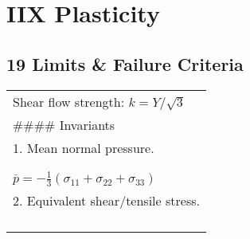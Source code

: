 \hypertarget{iix-plasticity}{%
\section{IIX Plasticity}\label{iix-plasticity}}

\hypertarget{limits-failure-criteria}{%
\subsection{19 Limits \& Failure
Criteria}\label{limits-failure-criteria}}

\begin{longtable}[]{@{}l@{}}
\toprule
\endhead
\begin{minipage}[t]{0.47\columnwidth}\raggedright
Shear flow strength: \(k = Y/\sqrt{3}\)\strut
\end{minipage}\tabularnewline
\begin{minipage}[t]{0.47\columnwidth}\raggedright
\#\#\#\# Invariants\strut
\end{minipage}\tabularnewline
\begin{minipage}[t]{0.47\columnwidth}\raggedright
1. Mean normal pressure.\strut
\end{minipage}\tabularnewline
\begin{minipage}[t]{0.47\columnwidth}\raggedright
\(\bar{p}=-\frac{1}{3} \operatorname{tr} \sigma=-\frac{1}{3}\left(\sigma_{k k}\right)\\\)\strut
\end{minipage}\tabularnewline
\begin{minipage}[t]{0.47\columnwidth}\raggedright
\(\bar{p}=-\frac{1}{3}\left(\sigma_{11}+\sigma_{22}+\sigma_{33}\right)\)\strut
\end{minipage}\tabularnewline
\begin{minipage}[t]{0.47\columnwidth}\raggedright
2. Equivalent shear/tensile stress.\strut
\end{minipage}\tabularnewline
\begin{minipage}[t]{0.47\columnwidth}\raggedright
\(\bar{\tau}=\frac{1}{\sqrt{2}}\left|\sigma^{\prime}\right|=\sqrt{\frac{1}{2} \operatorname{tr}\left(\sigma^{\prime 2}\right)}=\sqrt{\frac{1}{2} \sigma_{i j}^{\prime} \sigma_{i j}^{\prime}}\\\)\strut
\end{minipage}\tabularnewline
\begin{minipage}[t]{0.47\columnwidth}\raggedright
\(\bar{\tau}=\left[\frac{1}{6}\left(\left(\sigma_{11}-\sigma_{22}\right)^{2}+\left(\sigma_{22}-\sigma_{33}\right)^{2}+\left(\sigma_{33}-\sigma_{11}\right)^{2}\right)+\left(\sigma_{12}^{2}+\sigma_{23}^{2}+\sigma_{31}^{2}\right)\right]^{1 / 2}\\\)\strut

\end{minipage}
\end{longtable}
